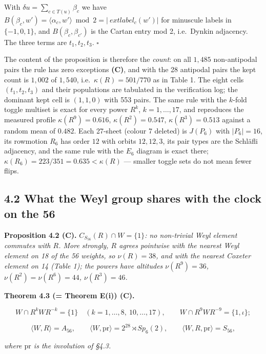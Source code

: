 \documentclass[
]{article}
\begin{document}
With \(\delta u = \sum_{c \in T(u)} \beta_c\) we have
\(B(\beta_c, w') = \langle \alpha_c, w' \rangle \bmod 2 = |\ ext{label}_c(w')|\)
for minuscule labels in \(\{-1,0,1\}\), and \(B(\beta_c, \beta_{c'})\)
is the Cartan entry mod 2, i.e.~Dynkin adjacency. The three terms are
\(t_1, t_2, t_3\). \(\square\)

The content of the proposition is therefore the \emph{count}: on all
\(1{,}485\) non-antipodal pairs the rule has zero exceptions
\textbf{(C)}, and with the 28 antipodal pairs the kept count is
\(1{,}002\) of \(1{,}540\), i.e.~\(\kappa(R) = 501/770\) as in Table 1.
The eight cells \((t_1,t_2,t_3)\) and their populations are tabulated in
the verification log; the dominant kept cell is \((1,1,0)\) with 553
pairs. The same rule with the \(k\)-fold toggle multiset is exact for
every power \(R^k\), \(k = 1, \dots, 17\), and reproduces the measured
profile \(\kappa(R^9) = 0.616\), \(\kappa(R^2) = 0.547\),
\(\kappa(R^3) = 0.513\) against a random mean of \(0.482\). Each
27-sheet (colour 7 deleted) is \(J(P_6)\) with \(|P_6| = 16\), its
rowmotion \(R_6\) has order \(12\) with orbits \(12, 12, 3\), its pair
types are the Schläfli adjacency, and the same rule with the \(E_6\)
diagram is exact there; \(\kappa(R_6) = 223/351 = 0.635 < \kappa(R)\)
--- smaller toggle sets do not mean fewer flips.

\subsection{4.2 What the Weyl group shares with the clock on the
56}\label{what-the-weyl-group-shares-with-the-clock-on-the-56}

\textbf{Proposition 4.2 (C).} \emph{\(C_{S_{56}}(R) \cap W = \{1\}\): no
non-trivial Weyl element commutes with \(R\). More strongly, \(R\)
agrees pointwise with the nearest Weyl element on 18 of the 56 weights,
so \(\nu(R) = 38\), and with the nearest Coxeter element on 14 (Table
1); the powers have altitudes \(\nu(R^9) = 36\),
\(\nu(R^2) = \nu(R^6) = 44\), \(\nu(R^3) = 46\).}

\textbf{Theorem 4.3 (= Theorem E(i)) (C).}

\[W \cap R^kWR^{-k} = \{1\} \quad (k = 1,\dots,8,\ 10,\dots,17), \qquad W \cap R^9WR^{-9} = \{1, \iota\} ;\]

\[\langle W, R \rangle = A_{56}, \qquad \langle W, \mathrm{pr} \rangle = 2^{28} \rtimes Sp_6(2), \qquad \langle W, R, \mathrm{pr} \rangle = S_{56},\]

\emph{where \(\mathrm{pr}\) is the involution of §4.3.}
\end{document}
